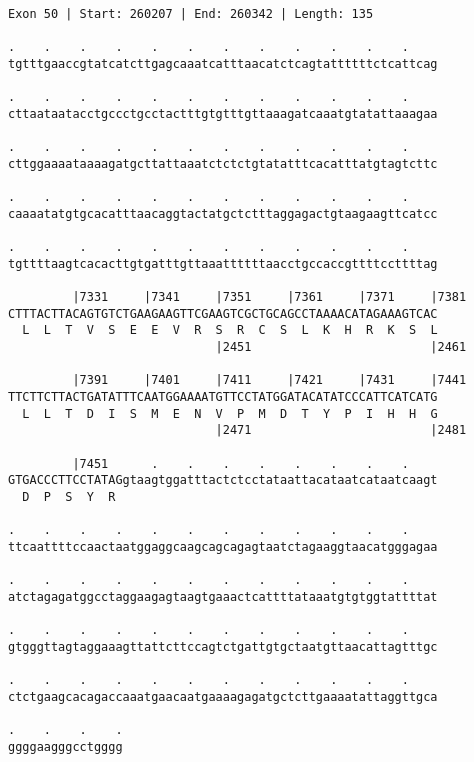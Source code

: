 \documentclass{article}
\begin{document}
\begin{Verbatim}[fontfamily=courier]
Exon 50 | Start: 260207 | End: 260342 | Length: 135

.    .    .    .    .    .    .    .    .    .    .    .    
tgtttgaaccgtatcatcttgagcaaatcatttaacatctcagtattttttctcattcag

.    .    .    .    .    .    .    .    .    .    .    .    
cttaataatacctgccctgcctactttgtgtttgttaaagatcaaatgtatattaaagaa

.    .    .    .    .    .    .    .    .    .    .    .    
cttggaaaataaaagatgcttattaaatctctctgtatatttcacatttatgtagtcttc

.    .    .    .    .    .    .    .    .    .    .    .    
caaaatatgtgcacatttaacaggtactatgctctttaggagactgtaagaagttcatcc

.    .    .    .    .    .    .    .    .    .    .    .    
tgttttaagtcacacttgtgatttgttaaattttttaacctgccaccgttttccttttag

         |7331     |7341     |7351     |7361     |7371     |7381
CTTTACTTACAGTGTCTGAAGAAGTTCGAAGTCGCTGCAGCCTAAAACATAGAAAGTCAC
  L  L  T  V  S  E  E  V  R  S  R  C  S  L  K  H  R  K  S  L
                             |2451                         |2461

         |7391     |7401     |7411     |7421     |7431     |7441
TTCTTCTTACTGATATTTCAATGGAAAATGTTCCTATGGATACATATCCCATTCATCATG
  L  L  T  D  I  S  M  E  N  V  P  M  D  T  Y  P  I  H  H  G
                             |2471                         |2481

         |7451      .    .    .    .    .    .    .    .    
GTGACCCTTCCTATAGgtaagtggatttactctcctataattacataatcataatcaagt
  D  P  S  Y  R                                             

.    .    .    .    .    .    .    .    .    .    .    .    
ttcaattttccaactaatggaggcaagcagcagagtaatctagaaggtaacatgggagaa

.    .    .    .    .    .    .    .    .    .    .    .    
atctagagatggcctaggaagagtaagtgaaactcattttataaatgtgtggtattttat

.    .    .    .    .    .    .    .    .    .    .    .    
gtgggttagtaggaaagttattcttccagtctgattgtgctaatgttaacattagtttgc

.    .    .    .    .    .    .    .    .    .    .    .    
ctctgaagcacagaccaaatgaacaatgaaaagagatgctcttgaaaatattaggttgca

.    .    .    .
ggggaagggcctgggg
\end{Verbatim}
\newpage
\end{document}
